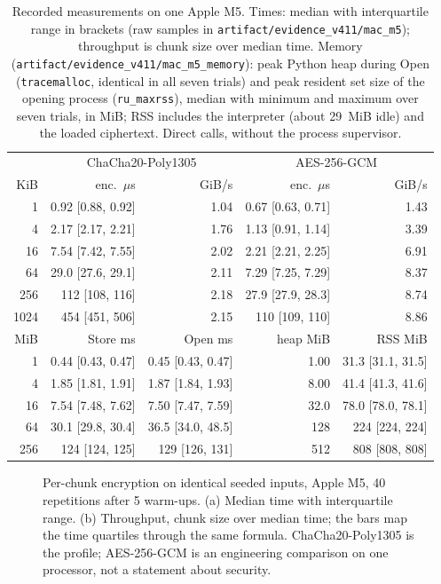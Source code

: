 \documentclass[pdflatex,sn-mathphys-num]{sn-jnl}
\newcommand{\code}[1]{\texttt{#1}}
\begin{document}
\begin{table}[htbp]
\caption{Recorded measurements on one Apple M5. Times: median with interquartile range in brackets (raw samples in \code{artifact/evidence\_v411/mac\_m5}); throughput is chunk size over median time. Memory (\code{artifact/evidence\_v411/mac\_m5\_memory}): peak Python heap during Open (\code{tracemalloc}, identical in all seven trials) and peak resident set size of the opening process (\code{ru\_maxrss}), median with minimum and maximum over seven trials, in MiB; RSS includes the interpreter (about 29~MiB idle) and the loaded ciphertext. Direct calls, without the process supervisor.}\label{tab:bench}
\centering\footnotesize
\begin{tabular}{@{}rrrrr@{}}\toprule
& \multicolumn{2}{c}{ChaCha20-Poly1305} & \multicolumn{2}{c}{AES-256-GCM}\\
KiB & enc.\ $\mu$s & GiB/s & enc.\ $\mu$s & GiB/s\\\midrule
1 & 0.92 [0.88, 0.92] & 1.04 & 0.67 [0.63, 0.71] & 1.43\\
4 & 2.17 [2.17, 2.21] & 1.76 & 1.13 [0.91, 1.14] & 3.39\\
16 & 7.54 [7.42, 7.55] & 2.02 & 2.21 [2.21, 2.25] & 6.91\\
64 & 29.0 [27.6, 29.1] & 2.11 & 7.29 [7.25, 7.29] & 8.37\\
256 & 112 [108, 116] & 2.18 & 27.9 [27.9, 28.3] & 8.74\\
1024 & 454 [451, 506] & 2.15 & 110 [109, 110] & 8.86\\\midrule
MiB & Store ms & Open ms & heap MiB & RSS MiB\\\midrule
1 & 0.44 [0.43, 0.47] & 0.45 [0.43, 0.47] & 1.00 & 31.3 [31.1, 31.5]\\
4 & 1.85 [1.81, 1.91] & 1.87 [1.84, 1.93] & 8.00 & 41.4 [41.3, 41.6]\\
16 & 7.54 [7.48, 7.62] & 7.50 [7.47, 7.59] & 32.0 & 78.0 [78.0, 78.1]\\
64 & 30.1 [29.8, 30.4] & 36.5 [34.0, 48.5] & 128 & 224 [224, 224]\\
256 & 124 [124, 125] & 129 [126, 131] & 512 & 808 [808, 808]\\\bottomrule
\end{tabular}
\end{table}

\begin{figure}[htbp]
\centering
\figbox{}
\caption{Per-chunk encryption on identical seeded inputs, Apple M5, 40 repetitions after 5 warm-ups. (a) Median time with interquartile range. (b) Throughput, chunk size over median time; the bars map the time quartiles through the same formula. ChaCha20-Poly1305 is the profile; AES-256-GCM is an engineering comparison on one processor, not a statement about security.}\label{fig:latency}
\end{figure}
\end{document}
